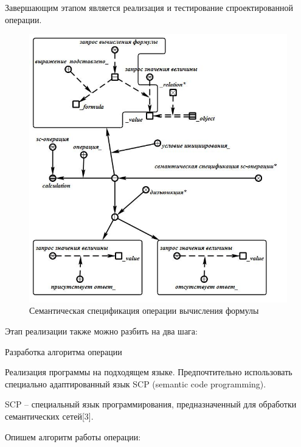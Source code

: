 Завершающим этапом является реализация и тестирование спроектированной операции.

\begin{figure}[H]
	\includegraphics[scale=0.5]{images/part7/chapter_learning_systems/step1.jpg}
	\caption{Семантическая спецификация операции вычисления формулы}
	\label{fig:step1}
\end{figure}

Этап реализации также можно разбить на два шага:

\begin{textitemize}
	\item Разработка алгоритма операции
	\item Реализация программы на подходящем языке. Предпочтительно использовать специально адаптированный язык SCP (semantic code programming).
\end{textitemize}

SCP -- специальный язык программирования, предназначенный для обработки семантических сетей{[}3{]}.

Опишем алгоритм работы операции:

